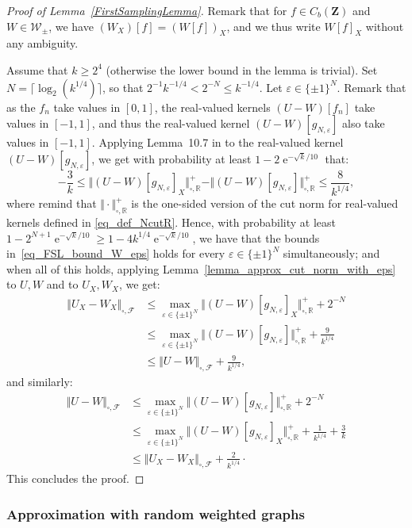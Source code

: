\documentclass{amsart}
\theoremstyle{plain}
\theoremstyle{definition}
\newcommand{\Space}{\mathbf{Z}}
\newcommand{\signed}{\pm}
\newcommand{\CbFunct}{C_b(\Space)}
\newcommand{\Kernel}{\mathcal{W}_{\signed}}
\newcommand{\NcutRpos}[1]{\Vert#1\Vert_{\square,\R}^+}
\newcommand{\NcutF}[1]{\Vert#1\Vert_{\square,\mathcal{F}}}
\newcommand{\R}{\mathbb{R}}
\newcommand{\eps}{\varepsilon}
\DeclareMathOperator{\e}{e}
\begin{document}
\begin{proof}[Proof of Lemma~\ref{FirstSamplingLemma}]
Remark that for $f\in\CbFunct$ and $W\in\Kernel$,
we have $(W_X)[f] = (W[f])_X$,
and we thus write $W[f]_X$ without any ambiguity.

Assume that $k\geq 2^4$
(otherwise the lower bound in the lemma is trivial).
Set $N=\lceil \log_2(k^{1/4}) \rceil$,
so that $2^{-1}k^{-1/4} < 2^{-N}  \leq k^{-1/4}$.
Let $\eps  \in  \{ \pm 1 \}^N$.
Remark that as the $f_n$ take values in $[0,1]$,
the real-valued kernels $(U-W)[f_n]$ take values in $[-1,1]$,
and thus 
the real-valued kernel $(U-W)[g_{N,\eps}]$
also take values in $[-1,1]$.
Applying Lemma~10.7 in \cite{Lovasz} to
the real-valued kernel $(U-W)\left[g_{N,\eps}\right]$,
we get with probability at least $1-2\e^{-\sqrt{k}/10}$ that:
\begin{equation}\label{eq_FSL_bound_W_eps}
- \frac{3}{k} \leq
\NcutRpos{(U-W)[g_{N,\eps}]_X}
- \NcutRpos{(U-W)[g_{N,\eps}] }
\leq \frac{8}{k^{1/4}} ,
\end{equation}
where remind that $\NcutRpos{\cdot}$ is the one-sided version of the
	cut norm for real-valued kernels defined in \eqref{eq_def_NcutR}.
Hence, with probability at least 
	$1-2^{N+1}\e^{-\sqrt{k}/10} \geq 1 - 4k^{1/4}\e^{-\sqrt{k}/10}$,
we have that the bounds in~\eqref{eq_FSL_bound_W_eps}
holds for every $\eps \in \{ \pm 1 \}^N$ simultaneously;
and when all of this holds, applying Lemma~\ref{lemma_approx_cut_norm_with_eps}
to $U, W$ and to $U_X, W_X$, we get:
\begin{align*}
\NcutF{U_X-W_X}
& \leq  \max_{\eps\in \{\pm 1\}^N} \NcutRpos{(U-W)[g_{N,\eps}]_X} 
		+ 2^{-N} \\
& \leq  \max_{\eps\in \{\pm 1\}^N} \NcutRpos{(U-W)[g_{N,\eps}] } 
		+ \frac{9}{k^{1/4}} \\
& \leq \NcutF{U-W} + \frac{9}{k^{1/4}},
\end{align*}
and similarly:
\begin{align*}
\NcutF{U-W}
& \leq  \max_{\eps\in \{\pm 1\}^N} \NcutRpos{(U-W)[g_{N,\eps}] } 
		+ 2^{-N} \\
& \leq  \max_{\eps\in \{\pm 1\}^N} \NcutRpos{(U-W)[g_{N,\eps}]_X} 
		+ \frac{1}{k^{1/4}} + \frac{3}{k} \\
& \leq \NcutF{U_X-W_X} + \frac{2}{k^{1/4}} \cdot
\end{align*}
This concludes the proof.
\end{proof}


\subsubsection{Approximation with random weighted graphs}
	\label{subsection:approx_M1_graphs}
\end{document}
